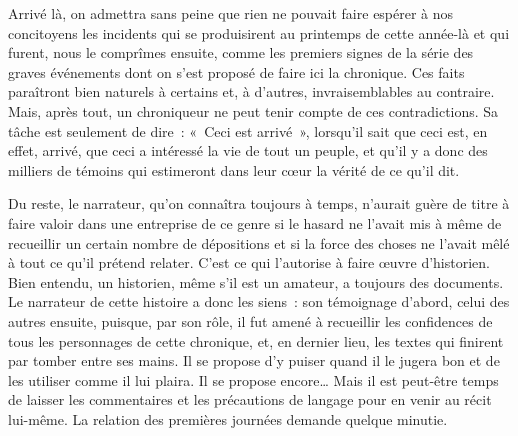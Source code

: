\documentclass[french,twoside]{book} %
\begin{document}
Arrivé là, on admettra sans peine que rien ne pouvait faire espérer à nos concitoyens les incidents qui se produisirent au printemps de cette année-là et qui furent, nous le comprîmes ensuite, comme les premiers signes de la série des graves événements dont on s’est proposé de faire ici la chronique. Ces faits paraîtront bien naturels à certains et, à d’autres, invraisemblables au contraire. Mais, après tout, un chroniqueur ne peut tenir compte de ces contradictions. Sa tâche est seulement de dire : « Ceci est arrivé », lorsqu’il sait que ceci est, en effet, arrivé, que ceci a intéressé la vie de tout un peuple, et qu’il y a donc des milliers de témoins qui estimeront dans leur cœur la vérité de ce qu’il dit.\par
Du reste, le narrateur, qu’on connaîtra toujours à temps, n’aurait guère de titre à faire valoir dans une entreprise de ce genre si le hasard ne l’avait mis à même de recueillir un certain nombre de dépositions et si la force des choses ne l’avait mêlé à tout ce qu’il prétend relater. C’est ce qui l’autorise à faire œuvre d’historien. Bien entendu, un historien, même s’il est un amateur, a toujours des documents. Le narrateur de cette histoire a donc les siens : son témoignage d’abord, celui des autres ensuite, puisque, par son rôle, il fut amené à recueillir les confidences de tous les personnages de cette chronique, et, en dernier lieu, les textes qui finirent par tomber entre ses mains. Il se propose d’y puiser quand il le jugera bon et de les utiliser comme il lui plaira. Il se propose encore… Mais il est peut-être temps de laisser les commentaires et les précautions de langage pour en venir au récit lui-même. La relation des premières journées demande quelque minutie.
\end{document}
